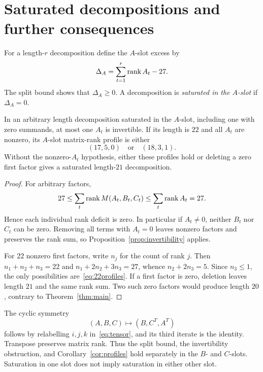 \section{Saturated decompositions and further consequences}\label{sec:consequences}

For a length-$r$ decomposition define the $A$-slot excess by
\[
 \Delta_A=\sum_{t=1}^r\operatorname{rank} A_t-27.
\]
The split bound shows that $\Delta_A\geq0$. A decomposition is
\emph{saturated in the $A$-slot} if $\Delta_A=0$.

\begin{corollary}\label{cor:profiles}
In an arbitrary length decomposition saturated in the $A$-slot,
including one with zero summands, at most one $A_t$ is invertible.
If its length is $22$ and all $A_t$ are nonzero, its $A$-slot
matrix-rank profile is either
\begin{equation}\label{eq:22profiles}
 (17,5,0)\quad\text{or}\quad(18,3,1).
\end{equation}
Without the nonzero-$A_t$ hypothesis, either these profiles hold or
deleting a zero first factor gives a saturated length-$21$
decomposition.
\end{corollary}
\begin{proof}
For arbitrary factors,
\[
 27\leq\sum_t\operatorname{rank} M(A_t,B_t,C_t)
       \leq\sum_t\operatorname{rank} A_t=27.
\]
Hence each individual rank deficit is zero. In particular if $A_t\ne0$,
neither $B_t$ nor $C_t$ can be zero. Removing all terms with $A_t=0$
leaves nonzero factors and preserves the rank sum, so
Proposition~\ref{prop:invertibility} applies.

For $22$ nonzero first factors, write $n_j$ for the count of rank $j$.
Then $n_1+n_2+n_3=22$ and $n_1+2n_2+3n_3=27$, whence
$n_2+2n_3=5$. Since $n_3\leq1$, the only possibilities
are~\eqref{eq:22profiles}. If a first factor is zero, deletion leaves
length $21$ and the same rank sum. Two such zero factors would produce
length $20$, contrary to Theorem~\ref{thm:main}.
\end{proof}

The cyclic symmetry
\[
 (A,B,C)\longmapsto(B,C^T,A^T)
\]
follows by relabelling $i,j,k$ in~\eqref{eq:tensor}, and its third
iterate is the identity. Transpose preserves matrix rank. Thus the
split bound, the invertibility obstruction, and
Corollary~\ref{cor:profiles} hold separately in the $B$- and $C$-slots.
Saturation in one slot does not imply saturation in either other slot.

